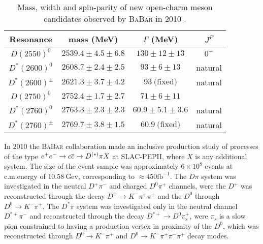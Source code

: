 \begin{table}
  \centering
  \begin{tabular}{c c c c}
    \toprule
    Resonance & mass (MeV) & $\Gamma$ (MeV) & $J^P$ \\ 
    \midrule
    $D(2550)^0 $ & $2539.4 \pm 4.5 \pm 6.8$ & $130 \pm 12 \pm 13$ & $0^-$ \\
    \addlinespace
    $D^*(2600)^0$ & $2608.7 \pm 2.4 \pm 2.5$ & $93 \pm 6 \pm 13$ & natural \\
    $D^*(2600)^\pm$ & $2621.3 \pm 3.7 \pm 4.2$ & $93 \ \text{(fixed)}$ & natural \\
    \addlinespace
    $D(2750)^0$ & $2752.4 \pm 1.7 \pm 2.7$ & $71 \pm 6 \pm 11$ & \\
    \addlinespace
    $D^*(2760)^0$ & $2763.3 \pm 2.3 \pm 2.3$ & $60.9  \pm 5.1 \pm 3.6$ & natural \\
    $D^*(2760)^\pm$ & $2769.7 \pm 3.8 \pm 1.5$ & $60.9 \ \text{(fixed)}$ & natural \\
    \bottomrule
  \end{tabular}
  \caption{Mass, width and spin-parity of new open-charm meson candidates observed by \textsc{BaBar} in 2010 \cite{delAmoSanchez:2010vq}.}
  \label{tab:BaBar_2010}
\end{table}

In 2010 the \textsc{BaBar} collaboration made an inclusive production study \cite{delAmoSanchez:2010vq} of processes of the type $e^+ e^- \to c \overline{c} \to D^{(*)} \pi X$ at SLAC-PEPII, where $X$ is any additional system. The size of the event sample was approximately $6 \times 10^8$ events at c.m.\@ energy of $10.58 \ \text{Gev}$, corresponding to $\approx 450 \text{fb}^{-1}$. The $D \pi$ system was investigated in the neutral $D^+ \pi^-$ and charged $D^0 \pi^+$ channels, were the $D^+$ was reconstructed through the decay $D^+ \to K^- \pi^+ \pi^+$ and the $D^0$ through $D^0 \to K^- \pi^+$. The $D^* \pi$ system was investigated only in the neutral channel $D^{* +} \pi^-$ and reconstructed through the decay $D^{* +} \to D^0 \pi^+_\text{s}$, were $\pi_\text{s}$ is a slow pion constrained to having a production vertex in proximity of the $D^0$, which was reconstructed through $D^0 \to K^- \pi^+$ and $D^0 \to K^- \pi^+ \pi^- \pi^+$ decay modes.

